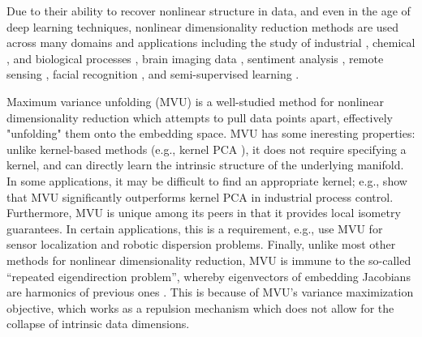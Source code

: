 \documentclass{article} %
\begin{document}
Due to their ability to recover nonlinear structure in data, and even in the age of deep learning techniques, nonlinear dimensionality reduction methods are used across many domains and applications including the study of industrial \citep{smvu-process}, chemical \citep{molecular-kinetics}, and biological processes \citep{nldr-chemotaxis}, brain imaging data \citep{dr-bid}, sentiment analysis \citep{nldr-sentiment-analysis}, remote sensing \citep{remote-sensing}, facial recognition \citep{facial-recognition}, and semi-supervised learning \citep{atlas,ss-isomap}.

Maximum variance unfolding (MVU) \citep{mvu} is a well-studied \citep{mvu-fastest-mixing-mp,ghojogh-1,ghojogh-2} method for nonlinear dimensionality reduction which attempts to pull data points apart, effectively "unfolding" them onto the embedding space. MVU has some ineresting properties: unlike kernel-based methods (e.g., kernel PCA \citep{kpca}), it does not require specifying a kernel, and can directly learn the intrinsic structure of the underlying manifold. In some applications, it may be difficult to find an appropriate kernel; e.g., \citet{mvu-process-monitoring} show that MVU significantly outperforms kernel PCA in industrial process control. Furthermore, MVU is unique among its peers in that it provides local isometry guarantees. In certain applications, this is a requirement, e.g., \citet{mvu-localization-network} use MVU for sensor localization and robotic dispersion problems. Finally, unlike most other methods for nonlinear dimensionality reduction, MVU is immune to the so-called ``repeated eigendirection problem'', whereby eigenvectors of embedding Jacobians are harmonics of previous ones \citep{nldr-chemotaxis,manifold-learning-whathowwhy}. This is because of MVU's variance maximization objective, which works as a repulsion mechanism which does not allow for the collapse of intrinsic data dimensions.
    
    
\end{document}
